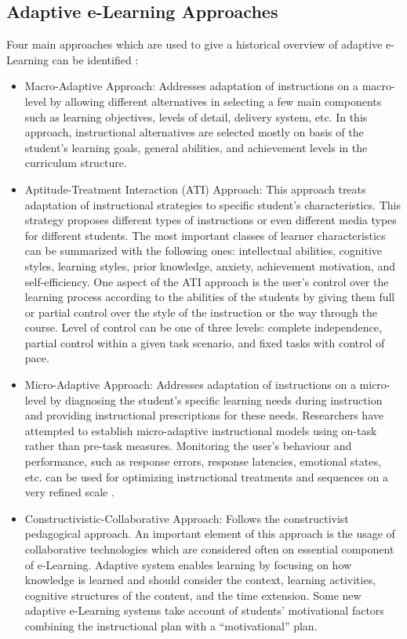 \documentclass[12pt,a4paper,final,twoside,onecolumn,titlepage]{book}
\begin{document}
\subsection{Adaptive e-Learning Approaches}
Four main approaches which are used to give a historical overview of adaptive e-Learning can be identified \cite{R10}:
\begin{itemize}
\item Macro-Adaptive Approach: Addresses adaptation of instructions on a macro-level by allowing different alternatives in selecting a few main components such as learning objectives, levels of detail, delivery system, etc. In this approach, instructional alternatives are selected mostly on basis of the student’s learning goals, general abilities, and achievement levels in the curriculum structure. 
\item Aptitude-Treatment Interaction (ATI) Approach: This approach treats adaptation of instructional strategies to specific student’s characteristics. This strategy proposes different types of instructions or even different media types for different students. The most important classes of learner characteristics can be summarized with the following ones: intellectual abilities, cognitive styles, learning styles, prior knowledge, anxiety, achievement motivation, and self-efficiency. One aspect of the ATI approach is the user’s control over the learning process according to the abilities of the students by giving them full or partial control over the style of the instruction or the way through the course. Level of control can be one of three levels: complete independence, partial control within a given task scenario, and fixed tasks with control of pace.
\item Micro-Adaptive Approach: Addresses adaptation of instructions on a micro-level by diagnosing the student’s specific learning needs during instruction and providing instructional prescriptions for these needs.  Researchers have attempted to establish micro-adaptive instructional models using on-task rather than pre-task 
measures.  Monitoring the user’s behaviour and performance, such as response errors, 
response latencies, emotional states, etc. can be used for optimizing instructional treatments and sequences on a very refined scale \cite{R15}. 
\item Constructivistic-Collaborative Approach: Follows the constructivist pedagogical approach. An important element of this approach is the usage of collaborative technologies which are considered often on essential component of e-Learning.  Adaptive system enables learning by focusing on how knowledge is learned and should consider the context, learning activities, cognitive structures of the content, and the time extension. Some new adaptive e-Learning systems take account of students’ motivational factors combining the instructional plan with a “motivational” plan.
\end{itemize}
\end{document}
